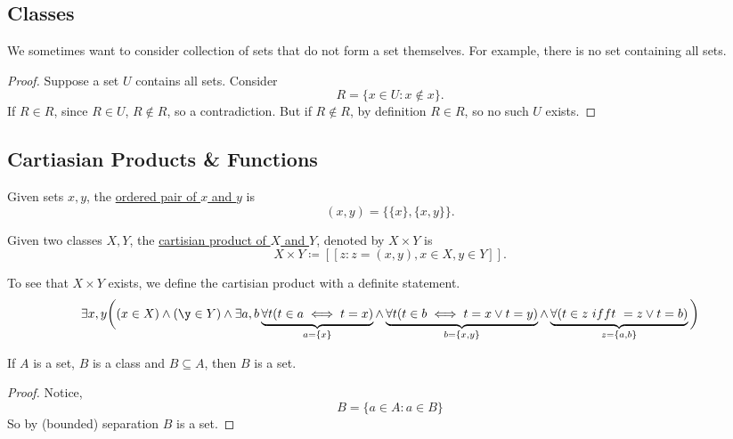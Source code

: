 \documentclass[11pt]{article}
\theoremstyle{theorem}
\begin{document}
\begin{titlepage}
\subsection{Classes}
We sometimes want to consider collection of sets that do not form a set
themselves. For example, there is no set containing all sets.
\begin{proof}
	Suppose a set $U$ contains all sets. Consider
	\begin{equation*}
		R = \{x \in U : x \notin x\}.
	\end{equation*}
	If $R \in R$, since $R \in U$, $R \notin R$, so a contradiction. But if
	$R \notin R$, by definition $R \in R$, so no such $U$ exists.
\end{proof}

\subsection{Cartiasian Products \& Functions}
\begin{definition}
    Given sets $x,y$, the \underline{ordered pair of $x$ and $y$} is
    \begin{equation*}
        (x,y) = \{\{x\},\{x,y\}\}.
    \end{equation*}
\end{definition}
\begin{definition}
	Given two classes $X,Y$, the \underline{cartisian product of $X$ and $Y$},
	denoted by $X\times Y$ is
	\begin{equation*}
		X\times Y \coloneqq [[z:z=(x,y), x \in X, y\in Y]].
	\end{equation*}
\end{definition}
To see that $X\times Y$ exists, we define the cartisian product with a definite
statement.
\begin{equation*}
	\exists x,y \bigg((x\in X) \wedge (\y\in Y) \wedge \exists a,b
		\underbrace{\forall t (t \in a \iff t = x)}_{a = \{x\}} \wedge
		\underbrace{\forall t(t \in b \iff t = x \vee t=y)}_{b=\{x,y\}}\wedge
	\underbrace{\forall(t\in z\ iff t\ =z \vee t=b)}_{z = \{a,b\}}\bigg)
\end{equation*}
\begin{remark}
	If $A$ is a set, $B$ is a class and $B\subseteq A$, then $B$ is a set.
\end{remark}
\begin{proof}
	Notice,
	\begin{equation*}
		B = \{a\in A : a \in B\}
	\end{equation*}
	So by (bounded) separation $B$ is a set.

\end{proof}
\end{titlepage}
\end{document}
